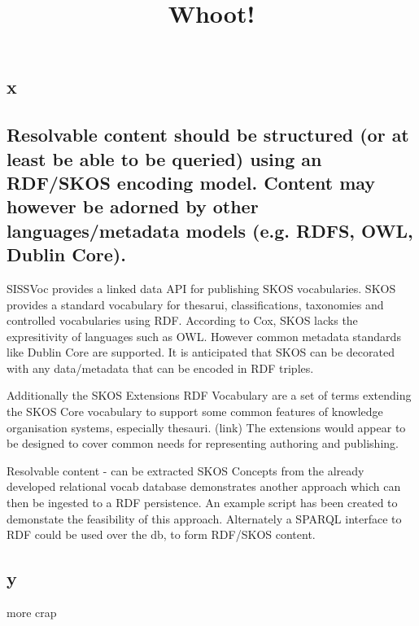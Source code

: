 \documentclass[10pt,a4paper]{article}
\title{Whoot!}
\date{}
\begin{document}
  \maketitle
    \begin{flushleft}
  \setlength{\parindent}{5ex}



\section{x}

\subsection{Resolvable content should be structured (or at least be able to be queried)
  using an RDF/SKOS encoding model. Content may however be adorned by other
  languages/metadata models (e.g. RDFS, OWL, Dublin Core).  }


	SISSVoc provides a linked data API for publishing SKOS vocabularies.
  SKOS provides a standard vocabulary for thesarui, classifications, taxonomies
  and controlled vocabularies using RDF.
   According to Cox, SKOS lacks the expresitivity of languages such as OWL.
  However common metadata standards like Dublin Core are supported.
    It is anticipated that SKOS can be decorated with any data/metadata that can
  be encoded in RDF triples.

	Additionally the SKOS Extensions RDF Vocabulary are a set of terms extending
	the SKOS Core vocabulary to support some common features of knowledge
	organisation systems, especially thesauri. (link) The extensions would appear
	to be designed to cover common needs for representing authoring and publishing.

	Resolvable content - can be extracted SKOS Concepts from the already developed
	relational vocab database demonstrates another approach which can then be
	ingested to a RDF persistence. An example script has been created to demonstate
	the feasibility of this approach. Alternately a SPARQL interface to RDF could
	be used over the db, to form RDF/SKOS content.


\subsection{y}
  more crap






  \end{flushleft}
\end{document}
